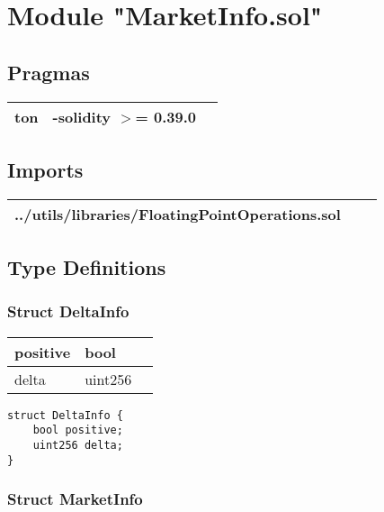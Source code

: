
\section{Module "MarketInfo.sol"}


\subsection{Pragmas}


\noindent\begin{tabular}{|l|l|p{5cm}|}\hline
ton & -solidity $>$= 0.39.0 &\\\hline
\end{tabular}


\subsection{Imports}


\noindent\begin{tabular}{|l|l|p{5cm}|}\hline
../utils/libraries/FloatingPointOperations.sol &\\\hline
\end{tabular}


\subsection{Type Definitions}


\subsubsection{Struct DeltaInfo}


\ifsoltables
\noindent\begin{tabular}{|l|l|p{6cm}|}\hline
positive & bool & \\\hline
delta & uint256 & \\\hline
\end{tabular}
\fi


\begin{lstlisting}[firstnumber=5]
struct DeltaInfo {
    bool positive;
    uint256 delta;
}
\end{lstlisting}

\subsubsection{Struct MarketInfo}


